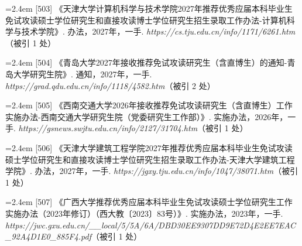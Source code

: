 {\nopagebreak\vspace{1pt}
\noindent\hangindent=2.4em \label{src:S0688}{\color{cAccent}[503]} 《天津大学计算机科学与技术学院2027年推荐优秀应届本科毕业生免试攻读硕士学位研究生和直接攻读博士学位研究生招生录取工作办法-计算机科学与技术学院》. 办法，2027年，一手. \textit{https://cs.tju.edu.cn/info/1171/6261.htm}（被引 1 处）\par
\vspace{0.6pt}
\vspace{3.5pt}\par
\nopagebreak\vspace{1pt}
\noindent\hangindent=2.4em \label{src:S0693}{\color{cAccent}[504]} 《青岛大学2027年接收推荐免试攻读研究生（含直博生）的通知-青岛大学研究生院》. 通知，2027年，一手. \textit{https://grad.qdu.edu.cn/info/1118/4582.htm}（被引 2 处）\par
\vspace{0.6pt}
\vspace{3.5pt}\par
\nopagebreak\vspace{1pt}
\noindent\hangindent=2.4em \label{src:S0699}{\color{cAccent}[505]} 《西南交通大学2026年接收推荐免试攻读研究生（含直博生）工作实施办法-西南交通大学研究生院（党委研究生工作部）》. 实施办法，2026年，一手. \textit{https://gsnews.swjtu.edu.cn/info/2127/31704.htm}（被引 1 处）\par
\vspace{0.6pt}
\vspace{3.5pt}\par
\nopagebreak\vspace{1pt}
\noindent\hangindent=2.4em \label{src:S0701}{\color{cAccent}[506]} 《天津大学建筑工程学院2027年推荐优秀应届本科毕业生免试攻读硕士学位研究生和直接攻读博士学位研究生招生录取工作办法-天津大学建筑工程学院》. 办法，2027年，一手. \textit{https://jgxy.tju.edu.cn/info/1047/38071.htm}（被引 1 处）\par
\vspace{0.6pt}
\vspace{3.5pt}\par
\nopagebreak\vspace{1pt}
\noindent\hangindent=2.4em \label{src:S0702}{\color{cAccent}[507]} 《广西大学推荐优秀应届本科毕业生免试攻读硕士学位研究生工作实施办法（2023年修订）（西大教〔2023〕83号）》. 实施办法，2023年，一手. \textit{https://jwc.gxu.edu.cn/\_\_local/5/5A/6A/DBD30EE9307DD9E72D4E2EE7EAC\_92A4D1E0\_885F4.pdf}（被引 1 处）\par
}
